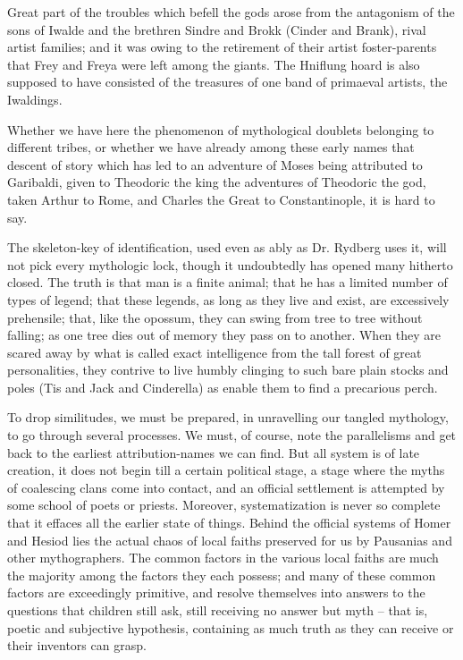 \documentclass[10pt,a4paper]{report}
\begin{document}
Great part of the troubles which befell the gods arose from the antagonism of the sons of Iwalde and the brethren Sindre and Brokk (Cinder and Brank), rival artist families; and it was owing to the retirement of their artist foster-parents that Frey and Freya were left among the giants. The Hniflung hoard is also supposed to have consisted of the treasures of one band of primaeval artists, the Iwaldings.

Whether we have here the phenomenon of mythological doublets belonging to different tribes, or whether we have already among these early names that descent of story which has led to an adventure of Moses being attributed to Garibaldi, given to Theodoric the king the adventures of Theodoric the god, taken Arthur to Rome, and Charles the Great to Constantinople, it is hard to say.

The skeleton-key of identification, used even as ably as Dr. Rydberg uses it, will not pick every mythologic lock, though it undoubtedly has opened many hitherto closed. The truth is that man is a finite animal; that he has a limited number of types of legend; that these legends, as long as they live and exist, are excessively prehensile; that, like the opossum, they can swing from tree to tree without falling; as one tree dies out of memory they pass on to another. When they are scared away by what is called exact intelligence from the tall forest of great personalities, they contrive to live humbly clinging to such bare plain stocks and poles (Tis and Jack and Cinderella) as enable them to find a precarious perch.

To drop similitudes, we must be prepared, in unravelling our tangled mythology, to go through several processes. We must, of course, note the parallelisms and get back to the earliest attribution-names we can find. But all system is of late creation, it does not begin till a certain political stage, a stage where the myths of coalescing clans come into contact, and an official settlement is attempted by some school of poets or priests. Moreover, systematization is never so complete that it effaces all the earlier state of things. Behind the official systems of Homer and Hesiod lies the actual chaos of local faiths preserved for us by Pausanias and other mythographers. The common factors in the various local faiths are much the majority among the factors they each possess; and many of these common factors are exceedingly primitive, and resolve themselves into answers to the questions that children still ask, still receiving no answer but myth -- that is, poetic and subjective hypothesis, containing as much truth as they can receive or their inventors can grasp.
\end{document}
